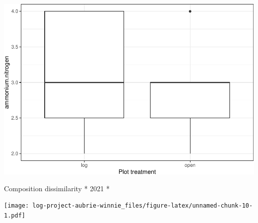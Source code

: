 \documentclass[
]{article}
\begin{document}
\includegraphics{log-project-aubrie-winnie_files/figure-latex/unnamed-chunk-8-1.pdf}

Composition dissimilarity * 2021 *

\texttt{[image: log-project-aubrie-winnie\_files/figure-latex/unnamed-chunk-10-1.pdf]}
\end{document}
